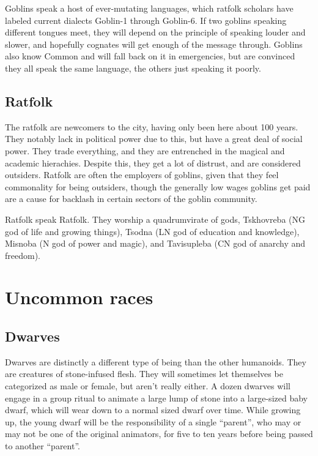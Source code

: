 \documentclass{report}
\begin{document}
Goblins speak a host of ever-mutating languages, which ratfolk scholars have
labeled current dialects Goblin-1 through Goblin-6. If two goblins speaking
different tongues meet, they will depend on the principle of speaking louder and
slower, and hopefully cognates will get enough of the message through. Goblins
also know Common and will fall back on it in emergencies, but are convinced
they all speak the same language, the others just speaking it poorly.

\subsection{Ratfolk}

The ratfolk are newcomers to the city, having only been here about 100 years.
They notably lack in political power due to this, but have a great deal of social
power. They trade everything, and they are entrenched in the magical and academic
hierachies. Despite this, they get a lot of distrust, and are considered outsiders.
Ratfolk are often the employers of goblins, given that they feel commonality for
being outsiders, though the generally low wages goblins get paid are a cause for
backlash in certain sectors of the goblin community.

Ratfolk speak Ratfolk. They worship a quadrumvirate of gods, Tskhovreba (NG
god of life and growing things), Tsodna (LN god of education and knowledge),
Misnoba (N god of power and magic), and Tavisupleba (CN god of anarchy and
freedom).

\section {Uncommon races}

\subsection{Dwarves}

Dwarves are distinctly a different type of being than the other humanoids. They
are creatures of stone-infused flesh. They will sometimes let themselves be categorized
as male or female, but aren't really either. A dozen dwarves will engage in a group
ritual to animate a large lump of stone into a large-sized baby dwarf, which will
wear down to a normal sized dwarf over time. While growing up, the young dwarf
will be the responsibility of a single ``parent'', who may or may not be one of
the original animators, for five to ten years before being passed to another
``parent''.
\end{document}
